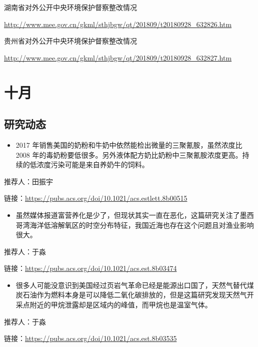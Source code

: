 \documentclass[
]{book}
\providecommand{\tightlist}{%
  \setlength{\itemsep}{0pt}\setlength{\parskip}{0pt}}
\begin{document}
湖南省对外公开中央环境保护督察整改情况

\url{http://www.mee.gov.cn/gkml/sthjbgw/qt/201809/t20180928_632826.htm}

贵州省对外公开中央环境保护督察整改情况

\url{http://www.mee.gov.cn/gkml/sthjbgw/qt/201809/t20180928_632827.htm}

\hypertarget{ux5341ux6708}{%
\section*{十月}\label{ux5341ux6708}}

\hypertarget{ux7814ux7a76ux52a8ux6001-11}{%
\subsection*{研究动态}\label{ux7814ux7a76ux52a8ux6001-11}}

\begin{itemize}
\tightlist
\item
  2017 年销售美国的奶粉和牛奶中依然能检出微量的三聚氰胺，虽然浓度比 2008 年的毒奶粉要低很多。另外液体配方奶比奶粉中三聚氰胺浓度更高。持续的低浓度污染可能是来自养奶牛的饲料。
\end{itemize}

推荐人：田振宇

链接：\url{https://pubs.acs.org/doi/10.1021/acs.estlett.8b00515}

\begin{itemize}
\tightlist
\item
  虽然媒体报道富营养化是少了，但现状其实一直在恶化，这篇研究关注了墨西哥湾海洋低溶解氧区的时空分布特征，我国近海也存在这个问题且对渔业影响很大。
\end{itemize}

推荐人：于淼

链接：\url{https://pubs.acs.org/doi/10.1021/acs.est.8b03474}

\begin{itemize}
\tightlist
\item
  很多人可能没意识到美国经过页岩气革命已经是能源出口国了，天然气替代煤炭石油作为燃料本身是可以降低二氧化碳排放的，但是这篇研究发现天然气开采点附近的甲烷泄露却是区域内的峰值，而甲烷也是温室气体。
\end{itemize}

推荐人：于淼

链接：\url{https://pubs.acs.org/doi/10.1021/acs.est.8b03535}
\end{document}

